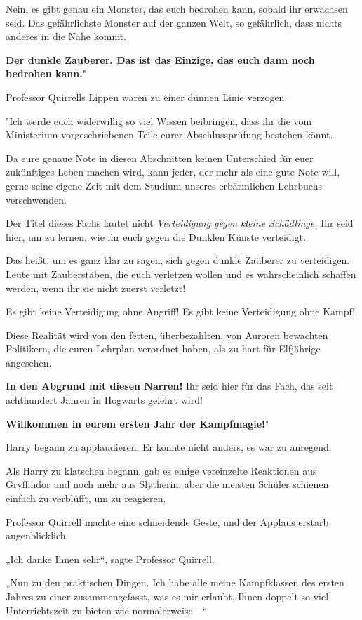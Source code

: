 {Nein, es gibt genau ein Monster, das euch bedrohen kann, sobald ihr erwachsen seid. Das gefährlichste Monster auf der ganzen Welt, so gefährlich, dass nichts anderes in die Nähe kommt.

\textbf{\hfill\break Der dunkle Zauberer. Das ist das Einzige, das euch dann noch bedrohen kann.}"

Professor Quirrells Lippen waren zu einer dünnen Linie verzogen.

"Ich werde euch widerwillig so viel Wissen beibringen, dass ihr die vom Ministerium vorgeschriebenen Teile eurer Abschlussprüfung bestehen könnt.

Da eure genaue Note in diesen Abschnitten keinen Unterschied für euer zukünftiges Leben machen wird, kann jeder, der mehr als eine gute Note will, gerne seine eigene Zeit mit dem Studium unseres erbärmlichen Lehrbuchs verschwenden.

Der Titel dieses Fachs lautet nicht \emph{Verteidigung gegen kleine Schädlinge.} Ihr seid hier, um zu lernen, wie ihr euch gegen die Dunklen Künste verteidigt.

Das heißt, um es ganz klar zu sagen, sich gegen dunkle Zauberer zu verteidigen. Leute mit Zauberstäben, die euch verletzen wollen und es wahrscheinlich schaffen werden, wenn ihr sie nicht zuerst verletzt!

Es gibt keine Verteidigung ohne Angriff! Es gibt keine Verteidigung ohne Kampf!

Diese Realität wird von den fetten, überbezahlten, von Auroren bewachten Politikern, die euren Lehrplan verordnet haben, als zu hart für Elfjährige angesehen.

\textbf{In den Abgrund mit diesen Narren!} Ihr seid hier für das Fach, das seit achthundert Jahren in Hogwarts gelehrt wird!

\textbf{Willkommen in eurem ersten Jahr der Kampfmagie!}"

Harry begann zu applaudieren. Er konnte nicht anders, es war zu anregend.

Als Harry zu klatschen begann, gab es einige vereinzelte Reaktionen aus Gryffindor und noch mehr aus Slytherin, aber die meisten Schüler schienen einfach zu verblüfft, um zu reagieren.

Professor Quirrell machte eine schneidende Geste, und der Applaus erstarb augenblicklich.

„Ich danke Ihnen sehr“, sagte Professor Quirrell.

„Nun zu den praktischen Dingen. Ich habe alle meine Kampfklassen des ersten Jahres zu einer zusammengefasst, was es mir erlaubt, Ihnen doppelt so viel Unterrichtszeit zu bieten wie normalerweise—“

}
